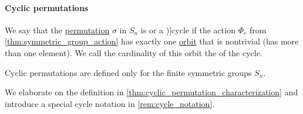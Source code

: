 \paragraph{Cyclic permutations}

\begin{definition}\label{def:cyclic_permutation}
  We say that the \hyperref[def:symmetric_group]{permutation} \( \sigma \) in \( S_n \) is  or a \term[ru=цикл (\cite[sec. 4.3]{Тыртышников2007ЛинейнаяАлгебра})]{cycle} if the action \( \Phi_e \) from \cref{thm:symmetric_group_action} has exactly one \hyperref[def:group_action_orbit]{orbit} that is nontrivial (has more than one element). We call the cardinality of this orbit the  of the cycle.
\end{definition}
\begin{comments}
  \item Cyclic permutations are defined only for the finite symmetric groups \( S_n \).
  \item We elaborate on the definition in \cref{thm:cyclic_permutation_characterization} and introduce a special cycle notation in \cref{rem:cycle_notation}.
\end{comments}

